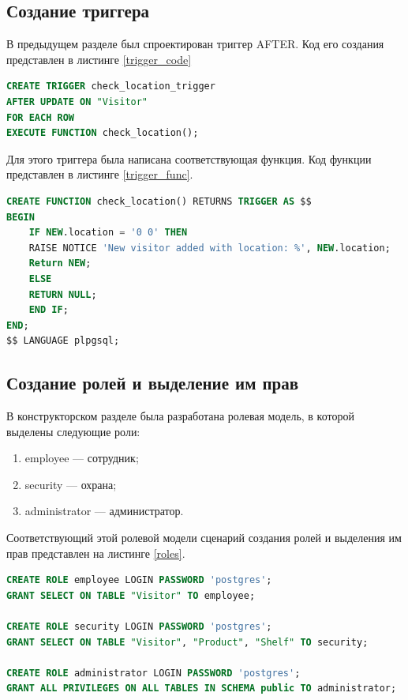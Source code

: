 \subsection{Создание триггера}

В предыдущем разделе был спроектирован триггер AFTER.
Код его создания представлен в листинге \ref{trigger_code}

\captionsetup{singlelinecheck = false, justification=raggedright}
\begin{lstlisting}[language=sql, caption=Реализация триггера AFTER, label=trigger_code]
CREATE TRIGGER check_location_trigger
AFTER UPDATE ON "Visitor"
FOR EACH ROW
EXECUTE FUNCTION check_location();
\end{lstlisting}
\captionsetup{singlelinecheck = false, justification=centering}

Для этого триггера была написана соответствующая функция.
Код функции представлен в листинге \ref{trigger_func}.

\captionsetup{singlelinecheck = false, justification=raggedright}
\begin{lstlisting}[language=sql, caption=Реализация функции, label=trigger_func]
CREATE FUNCTION check_location() RETURNS TRIGGER AS $$
BEGIN
    IF NEW.location = '0 0' THEN
    RAISE NOTICE 'New visitor added with location: %', NEW.location;
    Return NEW;
    ELSE
    RETURN NULL;
    END IF;
END;
$$ LANGUAGE plpgsql;
\end{lstlisting}
\captionsetup{singlelinecheck = false, justification=centering}

\subsection{Создание ролей и выделение им прав}

В конструкторском разделе была разработана ролевая модель, в которой выделены
следующие роли:
\begin{enumerate}[label=\arabic*.]
    \item employee --- сотрудник;
    \item security --- охрана;
    \item administrator --- администратор.
\end{enumerate}

Соответствующий этой ролевой модели сценарий создания ролей и выделения им прав
представлен на листинге \ref{roles}.

\begin{lstlisting}[language=sql, caption=Создание ролей и выделение им прав, label=roles]
CREATE ROLE employee LOGIN PASSWORD 'postgres';
GRANT SELECT ON TABLE "Visitor" TO employee;

CREATE ROLE security LOGIN PASSWORD 'postgres';
GRANT SELECT ON TABLE "Visitor", "Product", "Shelf" TO security;

CREATE ROLE administrator LOGIN PASSWORD 'postgres';
GRANT ALL PRIVILEGES ON ALL TABLES IN SCHEMA public TO administrator;

\end{lstlisting}
\captionsetup{singlelinecheck = false, justification=centering}

